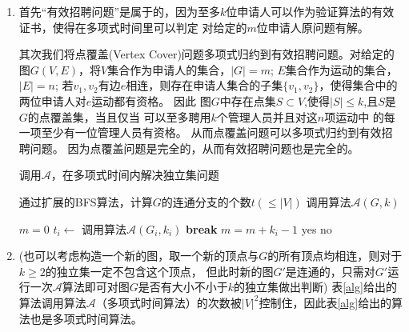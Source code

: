 \documentclass[a4paper]{article}
\begin{document}
\begin{enumerate}[label=\arabic*.]
  \setlength{\itemsep}{3\parskip}
  \setcounter{enumi}{2}
  \item 
     首先“有效招聘问题”是属于\NP 的，因为至多$k$位申请人可以作为验证算法的有效证书，使得在多项式时间里可以判定
     对给定的$m$位申请人原问题有解。
     
     其次我们将点覆盖(Vertex Cover)问题多项式归约到有效招聘问题。对给定的图$G(V,E)$，将$V$集合作为申请人的集合，$|G|=m$;
     $E$集合作为运动的集合，$|E|=n$;
     若$v_1,v_2$有边$e$相连，则存在申请人集合的子集$\{v_1,v_2\}$，使得集合中的两位申请人对$e$运动都有资格。
     因此
     图$G$中存在点集$S\subset V$,使得$|S|\leq k$,且$S$是$G$的点覆盖集，当且仅当
     可以至多聘用$k$个管理人员并且对这$n$项运动中
     的每一项至少有一位管理人员有资格。
     从而点覆盖问题可以多项式归约到有效招聘问题。
     因为点覆盖问题是\NP 完全的，从而有效招聘问题也是\NP 完全的。
  \setcounter{enumi}{21}
  
    \begin{algorithm}
    \caption{调用$\mathcal{A}$，在多项式时间内解决独立集问题}\label{alg}
    \begin{algorithmic}[1]
    \STATE 通过扩展的BFS算法，计算$G$的连通分支的个数$t(\leq |V|)$
    \RETURN 调用算法$\mathcal{A}(G,k)$
    \ENDIF
    
    \STATE $m=0$
    \STATE $t_i \leftarrow $ 调用算法$\mathcal{A}(G_i,k_i)$
    \STATE \textbf{break}
    \ENDIF
    \ENDFOR
    \STATE $m=m+k_i-1$
    \ENDFOR
    \RETURN yes
    \ELSE 
    \RETURN no
    \ENDIF
    \end{algorithmic}
    \end{algorithm}  
    \item (也可以考虑构造一个新的图，取一个新的顶点与$G$的所有顶点均相连，则对于$k\geq 2$的独立集一定不包含这个顶点，
    但此时新的图$G'$是连通的，只需对$G'$运行一次$\mathcal{A}$算法即可对图$G$是否有大小不小于$k$的独立集做出判断)
    表\ref{alg}给出的算法调用算法$\mathcal{A}$（多项式时间算法）的次数被$|V|^2$控制住，因此表\ref{alg}给出的算法也是多项式时间算法。
    

\end{enumerate}
\end{document}
